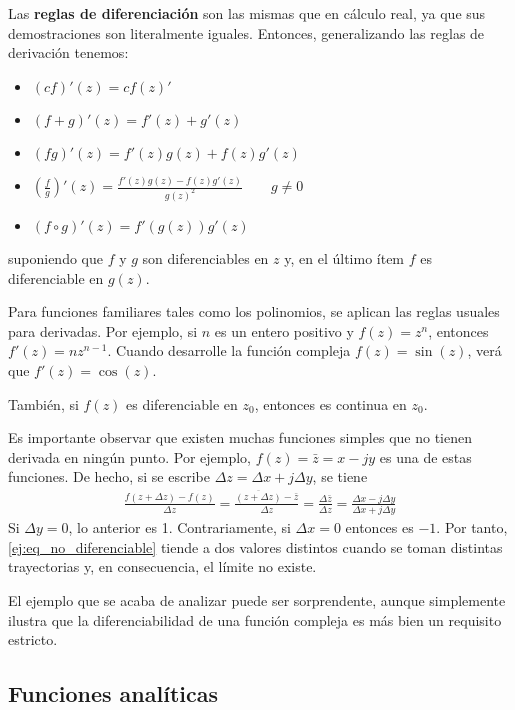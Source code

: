 Las \textbf{reglas de diferenciación} son las mismas que en cálculo real, ya que sus demostraciones son literalmente iguales. Entonces, generalizando las reglas de derivación tenemos:
\begin{itemize}
  \item $(cf)'(z)=cf(z)'$ 
  \item $(f+g)'(z)=f'(z)+g'(z)$
  \item $(fg)'(z)=f'(z)g(z)+f(z)g'(z)$
  \item $\left(\frac{f}{g}\right)'(z)=\frac{f'(z)g(z)-f(z)g'(z)}{g(z)^2}\qquad g\neq 0$
  \item $(f\circ g)'(z) = f'(g(z))g'(z)$
\end{itemize}
suponiendo que $f$ y $g$ son diferenciables en $z$ y, en el último ítem $f$ es diferenciable en $g(z)$.

Para funciones familiares tales como los polinomios, se aplican las reglas usuales para derivadas. Por ejemplo, si $n$ es un entero positivo y $f(z)=z^n$, entonces $f'(z)=nz^{n-1}$. Cuando desarrolle la función compleja $f(z)=\sin(z)$, verá que $f'(z)=\cos(z)$. 

También, si $f(z)$ es diferenciable en $z_0$, entonces es continua en $z_0$.

\begin{example}
  Es importante observar que existen muchas funciones simples que no tienen derivada en ningún punto. Por ejemplo, $f(z)=\bar{z}=x-jy$ es una de estas funciones. De hecho, si se escribe $\Delta z = \Delta x + j\Delta y$, se tiene 
  \begin{align}
    \frac{f(z+\Delta z) - f(z)}{\Delta z} = \frac{\overline{(z+\Delta z)}-\bar{z}}{\Delta z} = \frac{{\Delta \bar{z}}}{\Delta z} = \frac{\Delta x - j\Delta y}{\Delta x + j\Delta y}
    \label{ej:eq_no_diferenciable}
  \end{align}
  Si $\Delta y = 0$, lo anterior es 1. Contrariamente, si $\Delta x = 0$ entonces es $-1$. Por tanto, \ref{ej:eq_no_diferenciable} tiende a dos valores distintos cuando se toman distintas trayectorias y, en consecuencia, el límite no existe.
  \label{ej:funcion_no_analitica}
\end{example}

El ejemplo que se acaba de analizar puede ser sorprendente, aunque simplemente ilustra que la diferenciabilidad de una función compleja es más bien un requisito estricto.

\subsection{Funciones analíticas}


